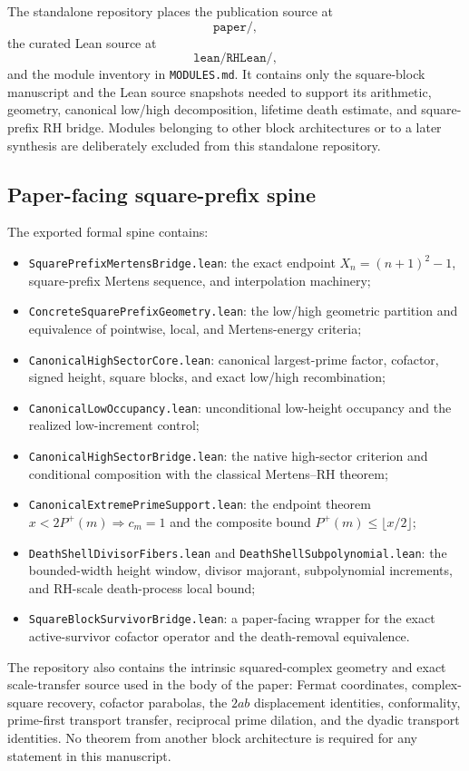 \documentclass[11pt]{article}
\theoremstyle{definition}
\newcommand{\1}{\mathbf{1}}
\begin{document}
The standalone repository places the publication source at
\[
 \texttt{paper/},
\]
the curated Lean source at
\[
 \texttt{lean/RHLean/},
\]
and the module inventory in \texttt{MODULES.md}.  It contains only the square-block manuscript and the Lean source snapshots needed to support its arithmetic, geometry, canonical low/high decomposition, lifetime death estimate, and square-prefix RH bridge.  Modules belonging to other block architectures or to a later synthesis are deliberately excluded from this standalone repository.

\subsection{Paper-facing square-prefix spine}

The exported formal spine contains:
\begin{itemize}
\item \texttt{SquarePrefixMertensBridge.lean}: the exact endpoint $X_n=(n+1)^2-1$, square-prefix Mertens sequence, and interpolation machinery;
\item \texttt{ConcreteSquarePrefixGeometry.lean}: the low/high geometric partition and equivalence of pointwise, local, and Mertens-energy criteria;
\item \texttt{CanonicalHighSectorCore.lean}: canonical largest-prime factor, cofactor, signed height, square blocks, and exact low/high recombination;
\item \texttt{CanonicalLowOccupancy.lean}: unconditional low-height occupancy and the realized low-increment control;
\item \texttt{CanonicalHighSectorBridge.lean}: the native high-sector criterion and conditional composition with the classical Mertens--RH theorem;
\item \texttt{CanonicalExtremePrimeSupport.lean}: the endpoint theorem $x<2P^+(m)\Rightarrow c_m=1$ and the composite bound $P^+(m)\le\lfloor x/2\rfloor$;
\item \texttt{DeathShellDivisorFibers.lean} and \texttt{DeathShellSubpolynomial.lean}: the bounded-width height window, divisor majorant, subpolynomial increments, and RH-scale death-process local bound;
\item \texttt{SquareBlockSurvivorBridge.lean}: a paper-facing wrapper for the exact active-survivor cofactor operator and the death-removal equivalence.
\end{itemize}

The repository also contains the intrinsic squared-complex geometry and exact scale-transfer source used in the body of the paper: Fermat coordinates, complex-square recovery, cofactor parabolas, the $2ab$ displacement identities, conformality, prime-first transport transfer, reciprocal prime dilation, and the dyadic transport identities.  No theorem from another block architecture is required for any statement in this manuscript.
\end{document}
